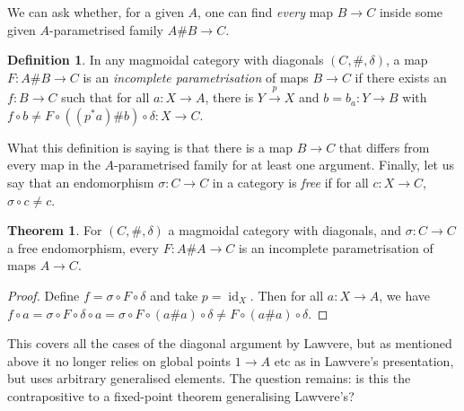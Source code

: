 \documentclass{tufte-handout}
\theoremstyle{definition}
\newtheorem*{definition}{Definition}
\newtheorem*{theorem}{Theorem}
\DeclareMathOperator{\id}{id}
\begin{document}
We can ask whether, for a given $A$, one can find \emph{every} map $B\to C$ inside some given $A$-parametrised family $A\# B \to C$.

\begin{definition}
In any magmoidal category with diagonals $(C,\#,\delta)$, a map $F\colon A\#B\to C$ is an \emph{incomplete parametrisation} of maps $B\to C$ if there exists an $f\colon B\to C$ such that for all $a\colon X\to A$, there is $Y\xrightarrow{p}X$ and $b = b_a\colon Y\to B$ with $f\circ b \not= F\circ((p^*a)\# b)\circ \delta\colon X\to C$.
\end{definition}

\noindent
What this definition is saying is that there is a map $B\to C$ that differs from every map in the $A$-parametrised family for at least one argument.
Finally, let us say that an endomorphism $\sigma\colon C\to C$ in a category is \emph{free} if for all $c\colon X\to C$, $\sigma\circ c \not=c$.

\begin{theorem}
  For $(C,\#,\delta)$ a magmoidal category with diagonals, and $\sigma \colon C\to C$ a free endomorphism, every $F\colon A\# A \to C$ is an incomplete parametrisation of maps $A\to C$.
\end{theorem}

\begin{proof}
  Define $f = \sigma\circ F\circ \delta$ and take $p=\id_X$. 
  Then for all $a\colon X\to A$, we have $f\circ a = \sigma \circ F\circ \delta \circ a= \sigma \circ F \circ (a\#a)\circ \delta \not=F\circ (a\#a)\circ \delta$.
\end{proof}

\noindent
This covers all the cases of the diagonal argument by Lawvere, but as mentioned above it no longer relies on global points $1\to A$ etc as in Lawvere's presentation, but uses arbitrary generalised elements. The question remains: is this the contrapositive to a fixed-point theorem generalising Lawvere's?
\end{document}
